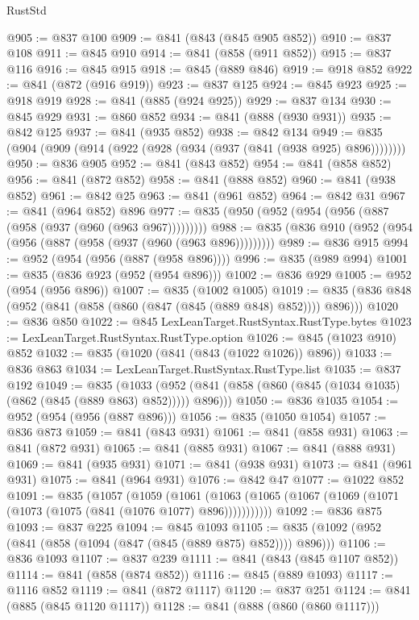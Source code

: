 \begin{lexlean}{RustStd}
\begin{coremodule}
{\begin{coremodule}
{{{{{{{{{{@905 := @837 @100
@909 := @841 (@843 (@845 @905 @852))
@910 := @837 @108
@911 := @845 @910
@914 := @841 (@858 (@911 @852))
@915 := @837 @116
@916 := @845 @915
@918 := @845 (@889 @846)
@919 := @918 @852
@922 := @841 (@872 (@916 @919))
@923 := @837 @125
@924 := @845 @923
@925 := @918 @919
@928 := @841 (@885 (@924 @925))
@929 := @837 @134
@930 := @845 @929
@931 := @860 @852
@934 := @841 (@888 (@930 @931))
@935 := @842 @125
@937 := @841 (@935 @852)
@938 := @842 @134
@949 := @835 (@904 (@909 (@914 (@922 (@928 (@934 (@937 (@841 (@938 @925) @896))))))))
@950 := @836 @905
@952 := @841 (@843 @852)
@954 := @841 (@858 @852)
@956 := @841 (@872 @852)
@958 := @841 (@888 @852)
@960 := @841 (@938 @852)
@961 := @842 @25
@963 := @841 (@961 @852)
@964 := @842 @31
@967 := @841 (@964 @852) @896
@977 := @835 (@950 (@952 (@954 (@956 (@887 (@958 (@937 (@960 (@963 @967)))))))))
@988 := @835 (@836 @910 (@952 (@954 (@956 (@887 (@958 (@937 (@960 (@963 @896)))))))))
@989 := @836 @915
@994 := @952 (@954 (@956 (@887 (@958 @896))))
@996 := @835 (@989 @994)
@1001 := @835 (@836 @923 (@952 (@954 @896)))
@1002 := @836 @929
@1005 := @952 (@954 (@956 @896))
@1007 := @835 (@1002 @1005)
@1019 := @835 (@836 @848 (@952 (@841 (@858 (@860 (@847 (@845 (@889 @848) @852)))) @896)))
@1020 := @836 @850
@1022 := @845 LexLeanTarget.RustSyntax.RustType.bytes
@1023 := LexLeanTarget.RustSyntax.RustType.option
@1026 := @845 (@1023 @910) @852
@1032 := @835 (@1020 (@841 (@843 (@1022 @1026)) @896))
@1033 := @836 @863
@1034 := LexLeanTarget.RustSyntax.RustType.list
@1035 := @837 @192
@1049 := @835
    (@1033 (@952 (@841 (@858 (@860 (@845 (@1034 @1035) (@862 (@845 (@889 @863) @852))))) @896)))
@1050 := @836 @1035
@1054 := @952 (@954 (@956 (@887 @896)))
@1056 := @835 (@1050 @1054)
@1057 := @836 @873
@1059 := @841 (@843 @931)
@1061 := @841 (@858 @931)
@1063 := @841 (@872 @931)
@1065 := @841 (@885 @931)
@1067 := @841 (@888 @931)
@1069 := @841 (@935 @931)
@1071 := @841 (@938 @931)
@1073 := @841 (@961 @931)
@1075 := @841 (@964 @931)
@1076 := @842 @47
@1077 := @1022 @852
@1091 := @835
    (@1057
      (@1059
        (@1061 (@1063 (@1065 (@1067 (@1069 (@1071 (@1073 (@1075 (@841 (@1076 @1077) @896)))))))))))
@1092 := @836 @875
@1093 := @837 @225
@1094 := @845 @1093
@1105 := @835 (@1092 (@952 (@841 (@858 (@1094 (@847 (@845 (@889 @875) @852)))) @896)))
@1106 := @836 @1093
@1107 := @837 @239
@1111 := @841 (@843 (@845 @1107 @852))
@1114 := @841 (@858 (@874 @852))
@1116 := @845 (@889 @1093)
@1117 := @1116 @852
@1119 := @841 (@872 @1117)
@1120 := @837 @251
@1124 := @841 (@885 (@845 @1120 @1117))
@1128 := @841 (@888 (@860 (@860 @1117)))
}}}}}}}}}}
\end{coremodule}}
\end{coremodule}
\end{lexlean}
